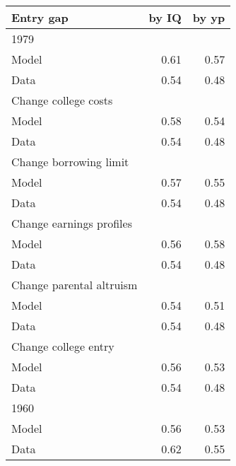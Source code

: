 \begin{tabular}{lrr}
\hline
Entry gap & by IQ  & by yp  \\ 
\hline
1979 &   &   \\ 
Model & 0.61  & 0.57  \\ 
Data & 0.54  & 0.48  \\ 
Change college costs &   &   \\ 
Model & 0.58  & 0.54  \\ 
Data & 0.54  & 0.48  \\ 
Change borrowing limit &   &   \\ 
Model & 0.57  & 0.55  \\ 
Data & 0.54  & 0.48  \\ 
Change earnings profiles &   &   \\ 
Model & 0.56  & 0.58  \\ 
Data & 0.54  & 0.48  \\ 
Change parental altruism &   &   \\ 
Model & 0.54  & 0.51  \\ 
Data & 0.54  & 0.48  \\ 
Change college entry &   &   \\ 
Model & 0.56  & 0.53  \\ 
Data & 0.54  & 0.48  \\ 
1960 &   &   \\ 
Model & 0.56  & 0.53  \\ 
Data & 0.62  & 0.55  \\ 
\hline
\end{tabular}%
